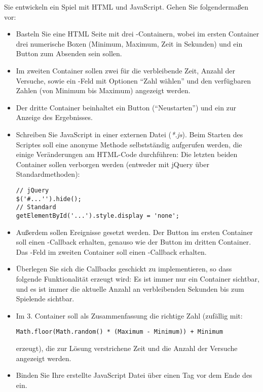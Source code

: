 %
\par Sie entwickeln ein Spiel mit HTML und JavaScript. Gehen Sie folgendermaßen
vor:
%
\begin{itemize}
\item
Basteln Sie eine HTML Seite mit drei -Containern, wobei im ersten
Container drei numerische Boxen (Minimum, Maximum, Zeit in Sekunden) und ein
Button zum Absenden sein sollen.
\item
Im zweiten Container sollen zwei  für die verbleibende Zeit, Anzahl der
Versuche, sowie ein -Feld mit Optionen ``Zahl wählen'' und den
verfügbaren Zahlen (von Minimum bis Maximum) angezeigt werden.
\item
Der dritte Container beinhaltet ein Button (``Neustarten'') und ein 
zur Anzeige des Ergebnisses.
\item
Schreiben Sie JavaScript in einer externen Datei (\emph{*.js}). Beim Starten
des Scriptes soll eine anonyme Methode selbstständig aufgerufen werden, die
einige Veränderungen am HTML-Code durchführen: Die letzten beiden Container
sollen verborgen werden (entweder mit jQuery über Standardmethoden):
%
\begin{lstlisting}
// jQuery
$('#...'').hide();
// Standard
getElementById('...').style.display = 'none';
\end{lstlisting}
%
\item
Außerdem sollen Ereignisse gesetzt werden. Der Button im ersten Container soll
einen -Callback erhalten, genauso wie der Button im dritten
Container. Das -Feld im zweiten Container soll einen
-Callback erhalten.
\item
Überlegen Sie sich die Callbacks geschickt zu implementieren, so dass folgende
Funktionalität erzeugt wird: Es ist immer nur ein Container sichtbar, und es
ist immer die aktuelle Anzahl an verbleibenden Sekunden bis zum Spielende
sichtbar.
\item
Im 3. Container soll als Zusammenfassung die richtige Zahl (zufällig mit:
%
\begin{lstlisting}
Math.floor(Math.random() * (Maximum - Minimum)) + Minimum
\end{lstlisting}
%
erzeugt), die zur Lösung verstrichene Zeit und die Anzahl der Versuche
angezeigt werden.
\item
Binden Sie Ihre erstellte JavaScript Datei über einen  Tag vor dem
Ende des  ein.
\end{itemize}